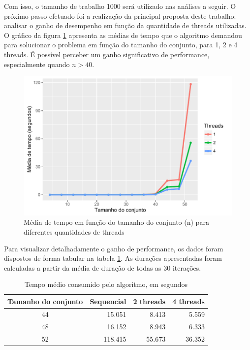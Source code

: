\documentclass[12pt]{article}
\begin{document}
Com isso, o tamanho de trabalho 1000 será utilizado nas análises a seguir. O próximo passo efetuado foi a realização da principal proposta deste trabalho: analisar o ganho de desempenho em função da quantidade de threads utilizadas. O gráfico da figura \ref{fig:performance} apresenta as médias de tempo que o algoritmo demandou para solucionar o problema em função do tamanho do conjunto, para 1, 2 e 4 threads. É possível perceber um ganho significativo de performance, especialmente quando $n > 40$.

\begin{figure}[ht]
    \centering
    \includegraphics[width=12cm]{performance}
    \caption{Média de tempo em função do tamanho do conjunto (n) para diferentes quantidades de threads}
    \label{fig:performance}
\end{figure}

Para visualizar detalhadamente o ganho de performance, os dados foram dispostos de forma tabular na tabela \ref{tab:speedtable}. As durações apresentadas foram calculadas a partir da média de duração de todas as 30 iterações.

\begin{table}[ht]
    \centering
    \caption{Tempo médio consumido pelo algoritmo, em segundos}
    \label{tab:speedtable}
    \smallskip

    \begingroup
    \renewcommand*{\arraystretch}{1.2}

    \begin{tabular}{|c|r|r|r|}
        \hline
        \textbf{Tamanho do conjunto} & \textbf{Sequencial} & \textbf{2 threads} & \textbf{4 threads} \\
        \hline
        44 & 15.051 & 8.413 & 5.559 \\
        \hline
        48 & 16.152 & 8.943 & 6.333 \\
        \hline
        52 & 118.415 & 55.673 & 36.352 \\
        \hline
    \end{tabular}

    \endgroup

\end{table}
\end{document}

